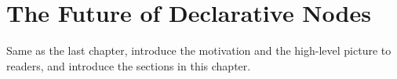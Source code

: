 \chapter{The Future of Declarative Nodes}
\label{cha:futurepart1}
Same as the last chapter, introduce the motivation and the high-level picture to
readers, and introduce the sections in this chapter.


